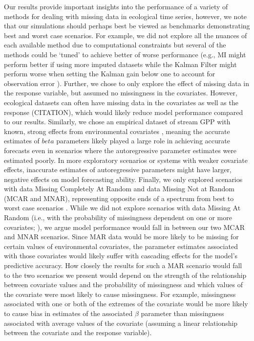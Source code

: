 \documentclass{article}
\begin{document}
\begin{linenumbers}
Our results provide important insights into the performance of a variety of methods for dealing with missing data in ecological time series, however, we note that our simulations should perhaps best be viewed as benchmarks demonstrating best and worst case scenarios. For example, we did not explore all the nuances of each available method due to computational constraints but several of the methods could be `tuned' to achieve better of worse performance (e.g., MI might perform better if using more imputed datasets \citep{honaker_what_2010} while the Kalman Filter might perform worse when setting the Kalman gain below one to account for observation error \citep{kalman_filter_1960}). Further, we chose to only explore the effect of missing data in the response variable, but assumed no missingness in the covariates. However, ecological datasets can often have missing data in the covariates as well as the response (CITATION), which would likely reduce model performance compared to our results. Similarly, we chose an empirical dataset of stream GPP with known, strong effects from environmental covariates \citep{hall_turbidity_2015,bernhardt_metabolic_2018}, meaning the accurate estimates of $beta$ parameters likely played a large role in achieving accurate forecasts even in scenarios where the autoregressive parameter estimates were estimated poorly. In more exploratory scenarios or systems with weaker covariate effects, inaccurate estimates of autoregressive parameters might have larger, negative effects on model forecasting ability. Finally, we only explored scenarios with data Missing Completely At Random and data Missing Not at Random (MCAR and MNAR), representing opposite ends of a spectrum from best to worst case scenarios \citep{newman_missing_2014}. While we did not explore scenarios with data Missing At Random (i.e., with the probability of missingness dependent on one or more covariates; \citep{newman_missing_2014}), we argue model performance would fall in between our two MCAR and MNAR scenarios. Since MAR data would be more likely to be missing for certain values of environmental covariates, the parameter estimates associated with those covariates would likely suffer \citep{nakagawa_missing_2008} with cascading effects for the model's predictive accuracy. How closely the results for such a MAR scenario would fall to the two scenarios we present would depend on the strength of the relationship between covariate values and the probability of missingness and which values of the covariate were most likely to cause missingness. For example, missingness associated with one or both of the extremes of the covariate would be more likely to cause bias in estimates of the associated $\beta$ parameter than missingness associated with average values of the covariate (assuming a linear relationship between the covariate and the response variable). 


\end{linenumbers}
\end{document}
